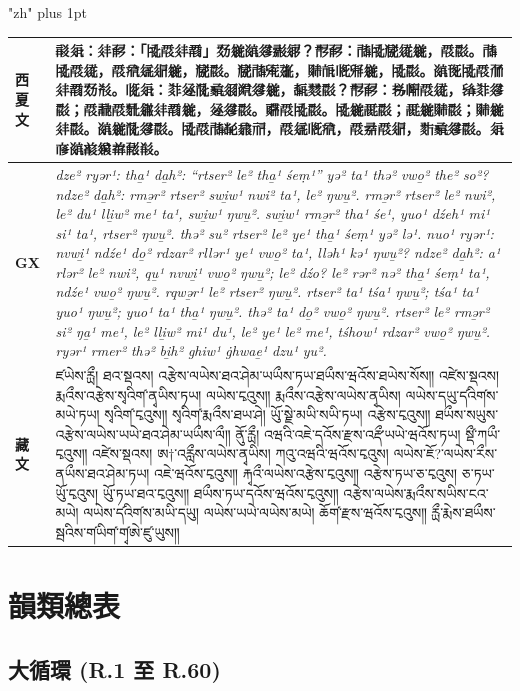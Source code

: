 \documentclass[12pt]{nextart_zh}
\begin{document}
\begingroup
\XeTeXlinebreaklocale "zh"
\XeTeXlinebreakskip=0pt plus 1pt
\sloppy
\small
\renewcommand{\arraystretch}{1.2}
\begin{longtable}{@{}p{}>{\raggedright\arraybackslash}p{}@{}}
\toprule
\textbf{西夏文} & 𘈒𗤄：𗢳𘒣：「𗎫𘟀𗢳𗵆」𘘣𗫂𘌽𗧘𘝶𗦜？𘘚𘒣：𗰜𗎫𗮔𗩱𗫂，𘟀𘟂。𗰜𗎫𘟀𗩱，𘟀𘟣𗦇𗤋𗫂，𗮔𘟂。𗮔𗰜𗋕𗡶，𘉐𗭍𗅋𗋃𗫂，𗎫𘟂。𘌽𗍊𗎫𘟀𗗙𗢳𗵆𘘣𘃞。𗅉𗤄：𘎳𗫻𘁟𗈞𗥃𘍦𗧘𗫂，𘓂𘙌𘟂？𘘚𘒣：𗈪𗆫𘟀𗩱，𗌭𘎳𗧘𘟂；𘟀𘘂𘟀𘙇𗫡𗢳𗵆𗫂，𗫻𗧘𘟂。𘓷𘟀𗎫𘟂。𗎫𗫂𗵘𘟂；𗵘𗫂𘉐𘟂；𘉐𗫂𗢳𘟂。𘌽𗫂𘁟𗧘𘟂。𗎫𘟀𗰜𘖀𗲠𗘺，𘟀𗦇𗅋𘟣，𘟀𘝵𘟀𗤋，𘘦𗈞𗧘𘟂。𗤄𗇋𘌽𗓨𗪲𗒐𘒩𘕤。 \\
\midrule
\textbf{GX} & \emph{dze² ryər¹: tha̱¹ da̱h²: ``rtser² le² tha̱¹ śeṃ¹'' yə² ta¹ thə² vwo̱² the² so²? ndze² da̱h²: rmə̱r² rtser² swi̱w¹ nwi² ta¹, le² ŋwu̱². rmə̱r² rtser² le² nwi², le² du¹ lli̱w² me¹ ta¹, swi̱w¹ ŋwu̱². swi̱w¹ rmə̱r² tha¹ śe¹, yuo¹ dźeh¹ mi¹ si¹ ta¹, rtser² ŋwu̱². thə² su² rtser² le² ye¹ tha̱¹ śeṃ¹ yə² lə¹. nuo¹ ryər¹: nvwi̱¹ ndźe¹ do̱² rdzar² rllər¹ ye¹ vwo̱² ta¹, lləh¹ kə¹ ŋwu̱²? ndze² da̱h²: a¹ rlər² le² nwi², qu̱¹ nvwi̱¹ vwo̱² ŋwu̱²; le² dźo? le² rər² nə² tha̱¹ śeṃ¹ ta¹, ndźe¹ vwo̱² ŋwu̱². rqwə̱r¹ le² rtser² ŋwu̱². rtser² ta¹ tśa¹ ŋwu̱²; tśa¹ ta¹ yuo¹ ŋwu̱²; yuo¹ ta¹ tha̱¹ ŋwu̱². thə² ta¹ do̱² vwo̱² ŋwu̱². rtser² le² rmə̱r² si² ŋa̱¹ me¹, le² lli̱w² mi¹ du¹, le² ye¹ le² me¹, tśhow¹ rdzar² vwo̱² ŋwu̱². ryər¹ rmer² thə² bi̱h² ghiw¹ ġhwae̱¹ dzu¹ yu².} \\
\midrule
\textbf{藏文} & ཛཡེས་རྻྀ། ཐའ་སྡའས། འརྩེས་ལཡེས་ཐའ་ཤེམ་ཡཡྀས་ཏཡ་ཐཡྀས་ཝའོས་ཐཡེས་སོས༎ འཛེས་སྡའས། རྨའྀས་འརྩེས་སྭའིག༹་ནྭཡིས་ཏཡ། ལཡེས་ངྭའུས༎ རྨའྀས་འརྩེས་ལཡེས་ནྭཡིས། ལཡེས་དཡུ་ད༹འིག༹ས་མཡེ་ཏཡ། སྭའིག༹་ངྭའུས༎ སྭའིག༹་རྨའྀས་ཐཡ་ཤེ། ཡོུ་སྗེ་མཡི་སཡི་ཏཡ། འརྩེས་ངྭའུས༎ ཐཡྀས་སཡུས་འརྩེས་ལཡེས་ཡཡེ་ཐའ་ཤེམ་ཡཡྀས་ལྀ༎ ནོུ་རྻྀ། འཝའི་འཇེ་དའོས་རྫས་འརྡྀ༹་ཡཡེ་ཝའོས་ཏཡ། སྡྀ༹་ཀཡྀ་ངྭའུས༎ འཛེས་སྡའས། ཨ†་འརླྀས་ལཡེས་ནྭཡིས། ཀའུ་འཝའི་ཝའོས་ངྭའུས། ལཡེས་ཇོ?་ལཡེས་རྀས་ནཡྀས་ཐའ་ཤེམ་ཏཡ། འཇེ་ཝའོས་ངྭའུས༎ རྐྭའྀ་ལཡེས་འརྩེས་ངྭའུས༎ འརྩེས་ཏཡ་ཅ་ངྭའུས། ཅ་ཏཡ་ཡོུ་ངྭའུས། ཡོུ་ཏཡ་ཐའ་ངྭའུས༎ ཐཡྀས་ཏཡ་དའོས་ཝའོས་ངྭའུས༎ འརྩེས་ལཡེས་རྨའྀས་སཡིས་ངའ་མཡེ། ལཡེས་ད༹འིག༹ས་མཡི་དཡུ། ལཡེས་ཡཡེ་ལཡེས་མཡེ། ཆོག༹་རྫས་ཝའོས་ངྭའུས༎ རྻྀ་རྨེས་ཐཡྀས་སྦའིས་ག༹ཡིག༹་གྭ༹ཨེ་ཛུ་ཡུས༎ \\
\bottomrule
\end{longtable}
\normalsize
\endgroup

\section{韻類總表}

\subsection{大循環 (R.1 至 R.60)}
\end{document}
